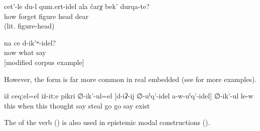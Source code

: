 \begin{exe}
	\ex	\label{ex:How can I forget your dear figure}
	\gll	cet'-le	du-l	qum.ert-idel 	ala	čarχ		bek'	durqa-te?\\
		how		forget	 figure		head	dear\\
	\glt	{} (lit. figure-head)

	\ex	\label{ex:‎‎Now what can we sayModified}
	\gll	na	ce	d-ik'ʷ-idel?\\
		now	what	say\\
	\glt	{} [modified corpus example]
\end{exe}

However, the form  is far more common in real embedded   (see  for more examples).

\begin{exe}
	\ex	\label{ex:‎This is when he is probably thinking}
	\gll	iž	ceqːel=el	iž-itːe	pikri	∅-ik'-ul=el		[d-iʡ-ij	∅-uˁq'-idel	a-w-uˁq'-idel]	∅-ik'-ul	le-w\\
		this	when	this	thought	say		steal	go\tsc{.pfv-modq}	go	say	exist\\
	\glt	{}
\end{exe}

The  of the verb  ()  is also used in epistemic modal constructions ().
